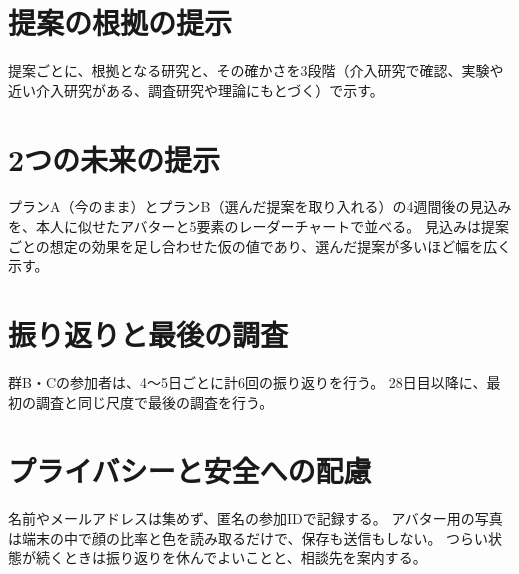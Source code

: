 \section{提案の根拠の提示}
提案ごとに、根拠となる研究と、その確かさを3段階（介入研究で確認、実験や近い介入研究がある、調査研究や理論にもとづく）で示す。

\section{2つの未来の提示}
プランA（今のまま）とプランB（選んだ提案を取り入れる）の4週間後の見込みを、本人に似せたアバターと5要素のレーダーチャートで並べる。
見込みは提案ごとの想定の効果を足し合わせた仮の値であり、選んだ提案が多いほど幅を広く示す。

\section{振り返りと最後の調査}
群B・Cの参加者は、4〜5日ごとに計6回の振り返りを行う。
28日目以降に、最初の調査と同じ尺度で最後の調査を行う。

\section{プライバシーと安全への配慮}
名前やメールアドレスは集めず、匿名の参加IDで記録する。
アバター用の写真は端末の中で顔の比率と色を読み取るだけで、保存も送信もしない。
つらい状態が続くときは振り返りを休んでよいことと、相談先を案内する。
